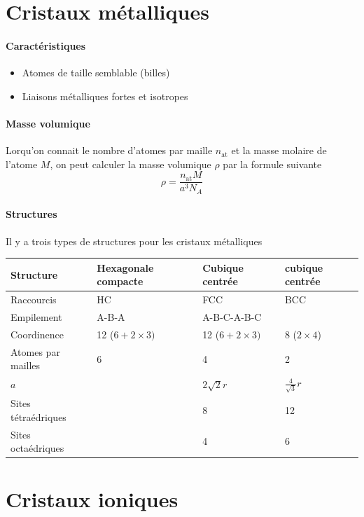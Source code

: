 \documentclass[11pt,a4paper,french]{article}
\begin{document}
\section{Cristaux métalliques}

\paragraph{Caractéristiques}
\begin{itemize}
	\item Atomes de taille semblable (billes)
	\item Liaisons métalliques fortes et isotropes
\end{itemize}

\paragraph{Masse volumique}
Lorqu'on connait le nombre d'atomes par maille $n_{\mathrm{at}}$ et la masse molaire de l'atome $M$,
on peut calculer la masse volumique $\rho$ par la formule suivante
\[ \rho = \frac{n_{\mathrm{at}}M}{a^3N_A} \]

\paragraph{Structures}
Il y a trois types de structures pour les cristaux métalliques
\begin{center}
	\begin{tabular}{|p{2cm}|l|l|l|}
		\hline
		Structure & Hexagonale compacte & Cubique centrée & cubique centrée\\
		\hline
		Raccourcis & HC & FCC & BCC\\
		\hline
		Empilement & A-B-A & A-B-C-A-B-C\\
		\hline
		Coordinence & 12 ($6 + 2\times3)$ & 12 ($6 + 2\times3)$ & 8 ($2 \times 4$)\\
		\hline
		Atomes par mailles & 6 & 4 & 2\\
		\hline
		$a$ & & $2\sqrt{2}r$ & $\frac{4}{\sqrt{3}}r$\\
		\hline
		Sites tétraédriques & & 8 & 12\\
		\hline
		Sites octaédriques & & 4 & 6\\
		\hline
	\end{tabular}
\end{center}

\section{Cristaux ioniques}
\end{document}
